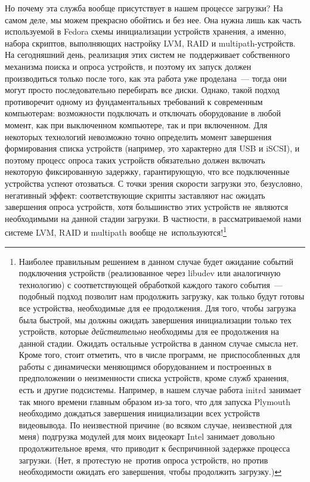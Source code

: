 \documentclass[10pt,oneside,a4paper]{article}
\begin{document}
Но почему эта служба вообще присутствует в нашем процессе загрузки? На самом
деле, мы можем прекрасно обойтись и без нее. Она нужна лишь как часть
используемой в Fedora схемы инициализации устройств хранения, а именно,
набора скриптов, выполняющих настройку LVM, RAID и multipath-устройств. На
сегодняшний день, реализация этих систем не~поддерживает собственного механизма
поиска и опроса устройств, и поэтому их запуск должен производиться только после
того, как эта работа уже проделана~--- тогда они могут просто последовательно
перебирать все диски. Однако, такой подход противоречит одному из
фундаментальных требований к современным компьютерам:
возможности подключать и отключать оборудование в любой момент, как при
выключенном компьютере, так и при включенном. Для некоторых
технологий невозможно точно определить момент завершения формирования списка устройств
(например, это характерно для USB и iSCSI), и поэтому процесс опроса
таких устройств обязательно должен включать некоторую фиксированную задержку,
гарантирующую, что все подключенные устройства успеют отозваться. С точки зрения
скорости загрузки это, безусловно, негативный эффект: соответствующие скрипты
заставляют нас ожидать завершения опроса устройств, хотя большинство этих
устройств не~являются необходимыми на данной стадии загрузки. В частности, в
рассматриваемой нами системе LVM, RAID и multipath вообще
не~используются!\footnote{Наиболее правильным решением в данном случае будет
ожидание событий подключения устройств (реализованное через libudev или
аналогичную технологию) с соответствующей обработкой каждого такого события~---
подобный подход позволит нам продолжить загрузку, как только будут готовы все
устройства, необходимые для ее продолжения. Для того, чтобы загрузка была
быстрой, мы должны ожидать завершения инициализации только тех устройств, которые
\emph{действительно} необходимы для ее продолжения на данной стадии. Ожидать
остальные устройства в данном случае смысла нет. Кроме того, стоит отметить, что
в числе программ, не~приспособленных для работы с динамически меняющимся
оборудованием и построенных в предположении о неизменности списка устройств,
кроме служб хранения, есть и другие подсистемы. Например, в нашем случае работа 
initrd занимает так много времени главным образом из-за того, что для запуска
Plymouth необходимо дождаться завершения инициализации всех устройств
видеовывода. По неизвестной причине (во всяком случае, неизвестной для меня)
подгрузка модулей для моих видеокарт Intel занимает довольно продолжительное
время, что приводит к беспричинной задержке процесса загрузки. (Нет, я протестую
не~против опроса устройств, но против необходимости ожидать его завершения, чтобы
продолжить загрузку.)}
\end{document}
